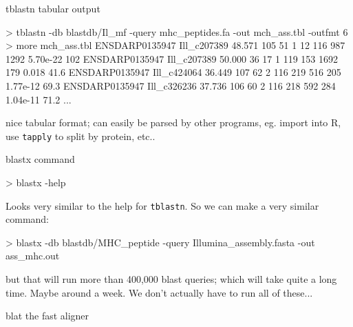 \documentclass[pdf]{beamer}
\begin{document}
\begin{frame}[fragile]{tblastn tabular output}
  \begin{consolecode}
> tblastn -db blastdb/Il_mf -query mhc_peptides.fa -out mch_ass.tbl -outfmt 6
> more mch_ass.tbl
ENSDARP0135947      Ill_c207389  48.571  105  51   1    12    116   987    1292    5.70e-22  102
ENSDARP0135947      Ill_c207389  50.000  36   17   1    119   153   1692   179     0.018     41.6
ENSDARP0135947      Ill_c424064  36.449  107  62   2    116   219   516    205     1.77e-12  69.3
ENSDARP0135947      Ill_c326236  37.736  106  60   2    116   218   592    284     1.04e-11  71.2
...
  \end{consolecode}
nice tabular format; can easily be parsed by other programs, eg. import into
R, use \texttt{tapply} to split by protein, etc..
\end{frame}

\begin{frame}[fragile]{blastx command}
  \begin{consolecode}
    > blastx -help
  \end{consolecode}
  Looks very similar to the help for \verb|tblastn|. So we can make a very
  similar command:

  \begin{consolecode}
    > blastx -db blastdb/MHC_peptide -query Illumina_assembly.fasta -out ass_mhc.out
  \end{consolecode}
  
  but that will run more than 400,000 blast queries; which will take quite a
  long time. Maybe around a week. We don't actually have to run all of
  these...
  
\end{frame}

\begin{frame}[fragile]{blat the fast aligner}
\end{frame}
\end{document}
